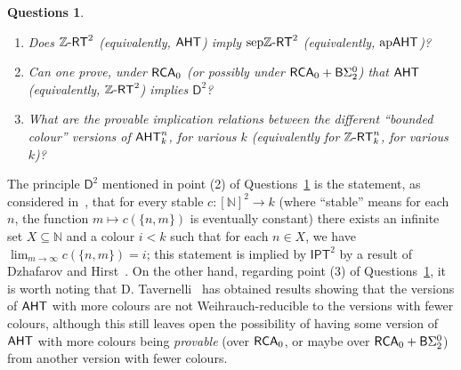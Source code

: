 \documentclass[10pt,a4paper]{amsart}
\newcommand{\zrt}{\mathnormal{\mathbb Z\text{-}\mathsf{RT}}}
\newcommand{\aht}{\mathnormal{\mathsf{AHT}}}
\newcommand{\apaht}{\mathnormal{\mathrm{ap}\mathsf{AHT}}}
\newcommand{\sepzrt}{\mathnormal{\mathrm{sep}\mathbb Z\text{-}\mathsf{RT}}}
\newcommand{\rca}{\mathnormal{\mathsf{RCA}}_0}
\newtheorem{question}[theorem]{Questions}
\theoremstyle{definition}
\begin{document}
\begin{question}\label{questions}\hfill
\begin{enumerate}
\item Does $\zrt^2$ (equivalently, $\aht$) imply $\sepzrt^2$ (equivalently, $\apaht$)?
\item Can one prove, under $\rca$ (or possibly under $\rca+\mathsf{B}\Sigma_2^0$) that $\aht$ (equivalently, $\zrt^2$) implies $\mathsf{D}^2$?
\item What are the provable implication relations between the different ``bounded colour'' versions of $\aht_k^n$, for various $k$ (equivalently for $\zrt_k^n$, for various $k$)?
\end{enumerate}
\end{question}

The principle $\mathsf{D}^2$ mentioned in point (2) of Questions~\ref{questions} is the statement, as considered in~\cite{dzhafarov-hirst-polarized}, that for every stable $c:[\mathbb N]^2\longrightarrow k$ (where ``stable'' means for each $n$, the function $m\longmapsto c(\{n,m\})$ is eventually constant) there exists an infinite set $X\subseteq\mathbb N$ and a colour $i<k$ such that for each $n\in X$, we have $\displaystyle{\lim_{m\to\infty}c(\{n,m\})=i}$; this statement is implied by $\mathsf{IPT}^2$ by a result of Dzhafarov and Hirst~\cite{dzhafarov-hirst-polarized}. On the other hand, regarding point (3) of Questions~\ref{questions}, it is worth noting that D. Tavernelli~\cite[Section 2.3]{tavernelli} has obtained results showing that the versions of $\aht$ with more colours are not Weihrauch-reducible to the versions with fewer colours, although this still leaves open the possibility of having some version of $\aht$ with more colours being {\it provable} (over $\rca$, or maybe over $\rca+\mathsf{B}\Sigma_2^0$) from another version with fewer colours. 
\end{document}
